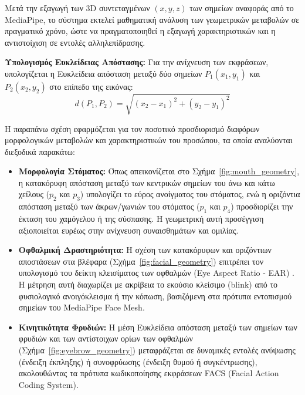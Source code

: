 \documentclass[twoside, a4paper, 11pt]{article}
\newcommand{\textlatin}[1]{\textenglish{#1}}
\begin{document}
Μετά την εξαγωγή των 3D συντεταγμένων $(x, y, z)$ των σημείων αναφοράς από το \textlatin{MediaPipe}, το σύστημα εκτελεί μαθηματική ανάλυση των γεωμετρικών μεταβολών σε πραγματικό χρόνο, ώστε να πραγματοποιηθεί η εξαγωγή χαρακτηριστικών και η αντιστοίχιση σε εντολές αλληλεπίδρασης.

\smallskip
\noindent\textbf{Υπολογισμός Ευκλείδειας Απόστασης:} Για την ανίχνευση των εκφράσεων, υπολογίζεται η Ευκλείδεια απόσταση μεταξύ δύο σημείων $P_1(x_1, y_1)$ και $P_2(x_2, y_2)$ στο επίπεδο της εικόνας:
\begin{equation}
d(P_1, P_2) = \sqrt{(x_2 - x_1)^2 + (y_2 - y_1)^2}
\end{equation}

Η παραπάνω σχέση εφαρμόζεται για τον ποσοτικό προσδιορισμό διαφόρων μορφολογικών μεταβολών και χαρακτηριστικών του προσώπου, τα οποία αναλύονται διεξοδικά παρακάτω:

\begin{itemize}
    \item \textbf{Μορφολογία Στόματος:} Όπως απεικονίζεται στο Σχήμα~\ref{fig:mouth_geometry}, η κατακόρυφη απόσταση μεταξύ των κεντρικών σημείων του άνω και κάτω χείλους ($p_2$ και $p_3$) υπολογίζει το εύρος ανοίγματος του στόματος, ενώ η οριζόντια απόσταση μεταξύ των άκρων/γωνιών του στόματος ($p_1$ και $p_4$) προσδιορίζει την έκταση του χαμόγελου ή της σύσπασης. Η γεωμετρική αυτή προσέγγιση αξιοποιείται ευρέως στην ανίχνευση συναισθημάτων και ομιλίας.
    
    \item \textbf{Οφθαλμική Δραστηριότητα:} Η σχέση των κατακόρυφων και οριζόντιων αποστάσεων στα βλέφαρα (Σχήμα~\ref{fig:facial_geometry}) επιτρέπει τον υπολογισμό του δείκτη κλεισίματος των οφθαλμών (\textlatin{Eye Aspect Ratio - EAR}) \cite{soukupova2016real}. Η μέτρηση αυτή διαχωρίζει με ακρίβεια το εκούσιο κλείσιμο (\textlatin{blink}) από το φυσιολογικό ανοιγόκλεισμα ή την κόπωση, βασιζόμενη στα πρότυπα εντοπισμού σημείων του \textlatin{MediaPipe Face Mesh}.
    
    \item \textbf{Κινητικότητα Φρυδιών:} Η μέση Ευκλείδεια απόσταση μεταξύ των σημείων των φρυδιών και των αντίστοιχων ορίων των οφθαλμών (Σχήμα~\ref{fig:eyebrow_geometry}) μεταφράζεται σε δυναμικές εντολές ανύψωσης (ένδειξη έκπληξης) ή συνοφρύωσης (ένδειξη θυμού ή συγκέντρωσης), ακολουθώντας τα πρότυπα κωδικοποίησης εκφράσεων \textlatin{FACS} (\textlatin{Facial Action Coding System}).
\end{itemize}
\end{document}
